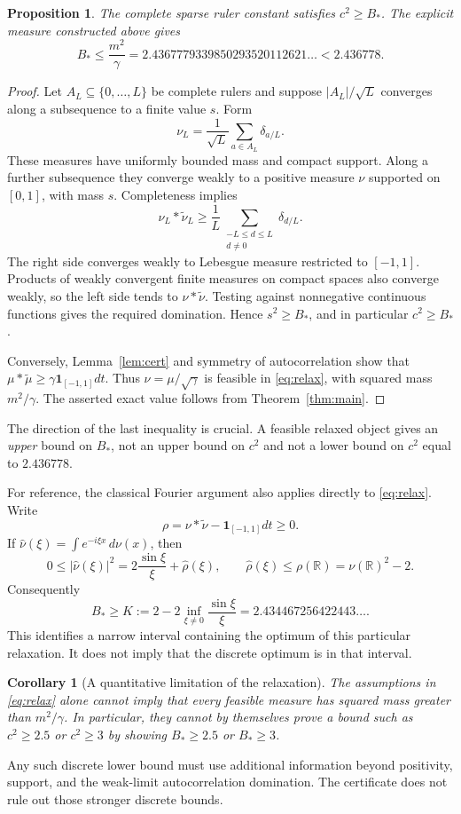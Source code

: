 \documentclass[11pt,a4paper]{article}
\newtheorem{proposition}[theorem]{Proposition}
\newtheorem{corollary}[theorem]{Corollary}
\theoremstyle{remark}\newtheorem{remark}[theorem]{Remark}
\newcommand{\R}{\mathbb R}
\newcommand{\ind}{\mathbf 1}
\begin{document}
\begin{proposition}\label{prop:ruler}
The complete sparse ruler constant satisfies $c^2\ge B_*$. The explicit measure constructed above gives
\[
 B_*\le\frac{m^2}{\gamma}
 =2.4367779339850293520112621\ldots<2.436778.
\]
\end{proposition}
\begin{proof}
Let $A_L\subseteq\{0,\ldots,L\}$ be complete rulers and suppose $|A_L|/\sqrt L$ converges along a subsequence to a finite value $s$. Form
\[
 \nu_L=\frac1{\sqrt L}\sum_{a\in A_L}\delta_{a/L}.
\]
These measures have uniformly bounded mass and compact support. Along a further subsequence they converge weakly to a positive measure $\nu$ supported on $[0,1]$, with mass $s$. Completeness implies
\[
 \nu_L*\widetilde\nu_L
 \ge\frac1L\sum_{\substack{-L\le d\le L\\d\ne0}}\delta_{d/L}.
\]
The right side converges weakly to Lebesgue measure restricted to $[-1,1]$. Products of weakly convergent finite measures on compact spaces also converge weakly, so the left side tends to $\nu*\widetilde\nu$. Testing against nonnegative continuous functions gives the required domination. Hence $s^2\ge B_*$, and in particular $c^2\ge B_*$.

Conversely, Lemma~\ref{lem:cert} and symmetry of autocorrelation show that $\mu*\widetilde\mu\ge\gamma\ind_{[-1,1]}dt$. Thus $\nu=\mu/\sqrt\gamma$ is feasible in \eqref{eq:relax}, with squared mass $m^2/\gamma$. The asserted exact value follows from Theorem~\ref{thm:main}.
\end{proof}

The direction of the last inequality is crucial. A feasible relaxed object gives an \emph{upper} bound on $B_*$, not an upper bound on $c^2$ and not a lower bound on $c^2$ equal to $2.436778$.

For reference, the classical Fourier argument also applies directly to \eqref{eq:relax}. Write
\[
 \rho=\nu*\widetilde\nu-\ind_{[-1,1]}dt\ge0.
\]
If $\widehat\nu(\xi)=\int e^{-i\xi x}\,d\nu(x)$, then
\[
 0\le|\widehat\nu(\xi)|^2
 =2\frac{\sin\xi}{\xi}+\widehat\rho(\xi),
 \qquad \widehat\rho(\xi)\le\rho(\R)=\nu(\R)^2-2.
\]
Consequently
\[
 B_*\ge K:=2-2\inf_{\xi\ne0}\frac{\sin\xi}{\xi}
 =2.434467256422443\ldots.
\]
This identifies a narrow interval containing the optimum of this particular relaxation. It does not imply that the discrete optimum is in that interval.

\begin{corollary}[A quantitative limitation of the relaxation]
The assumptions in \eqref{eq:relax} alone cannot imply that every feasible measure has squared mass greater than $m^2/\gamma$. In particular, they cannot by themselves prove a bound such as $c^2\ge2.5$ or $c^2\ge3$ by showing $B_*\ge2.5$ or $B_*\ge3$.
\end{corollary}
Any such discrete lower bound must use additional information beyond positivity, support, and the weak-limit autocorrelation domination. The certificate does not rule out those stronger discrete bounds.
\end{document}
